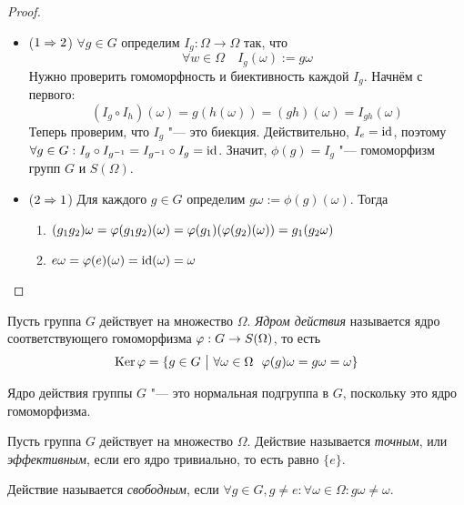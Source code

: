 \begin{proof}~
	\begin{itemize}
		\item ($1 \Rightarrow 2$) $\forall g \in G$ определим $I_g \colon \Omega \to \Omega$ так, что
		\[
			\forall w \in \Omega \quad I_g(\omega) := g\omega
		\]
		Нужно проверить гомоморфность и биективность каждой $I_g$. Начнём с первого:
		\[
			(I_g \circ I_h)(\omega) = g(h(\omega)) = (gh)(\omega) = I_{gh}(\omega)
		\]
		Теперь проверим, что $I_g$ "--- это биекция. Действительно, $I_e = \operatorname{id}$, поэтому $\forall g \in G: I_g\circ I_{g^{-1}} = I_{g^{-1}}\circ I_g = \operatorname{id}$. Значит, $\phi(g) = I_g$ "--- гомоморфизм групп $G$ и $S(\Omega)$.
		
		\item($2 \Rightarrow 1$) Для каждого $g \in G$ определим $g\omega := \phi(g)(\omega)$. Тогда 
		\begin{enumerate}
			\item $(g_1g_2)\omega = \phi(g_1g_2)(\omega) \hm= \phi(g_1)(\phi(g_2)(\omega)) = g_1(g_2\omega)$
			
			\item $e\omega \hm= \phi(e)(\omega) = \id(\omega) = \omega$
		\end{enumerate}
	\end{itemize}
\end{proof}

\begin{definition}
	Пусть группа $G$ действует на множество $\Omega$. \textit{Ядром действия} называется ядро соответствующего гомоморфизма $\phi: G \hm\to S(\Omega)$, то есть 
	\[
		\operatorname{Ker} \varphi = \{g \in G \ \big|\  \forall \omega \in \Omega\ \ \varphi(g)\omega = g\omega = \omega\}
	\]
\end{definition}

\begin{note}
	Ядро действия группы $G$ "--- это нормальная подгруппа в $G$, поскольку это ядро гомоморфизма.
\end{note}

\begin{definition}
	Пусть группа $G$ действует на множество $\Omega$. Действие называется \textit{точным}, или \textit{эффективным}, если его ядро тривиально, то есть равно $\{e\}$.
\end{definition}

\begin{definition}
	Действие называется \textit{свободным}, если $\forall g \in G, g\ne e: \forall \omega \in \Omega: g\omega \ne \omega$.
\end{definition}

